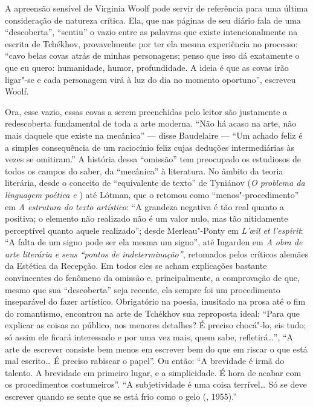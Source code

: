 A apreensão sensível de Virginia Woolf pode servir de referência
para uma última consideração de natureza crítica. Ela, que nas
páginas de seu diário fala de uma ``descoberta'', ``sentiu'' o
vazio entre as palavras que existe intencionalmente na escrita
de Tchékhov, provavelmente por ter ela mesma experiência no
processo: ``cavo belas covas atrás de minhas personagens; penso que
isso dá exatamente o que eu quero: humanidade, humor, profundidade.
A ideia é que as covas irão ligar"-se e cada personagem virá à luz
do dia no momento oportuno'', escreveu Woolf. 

Ora, esse vazio, essas covas a serem preenchidas pelo leitor são
justamente a redescoberta fundamental de toda a arte moderna.
``Não há acaso na arte, não mais daquele que existe na mecânica''
--- disse Baudelaire --- ``Um achado feliz é a simples consequência
de um raciocínio feliz cujas deduções intermediárias às vezes se
omitiram.'' A história dessa ``omissão'' tem preocupado os estudiosos
de todos os campos do saber, da ``mecânica'' à literatura. No âmbito
da teoria literária, desde o conceito de ``equivalente de texto''
de Tyniánov (\emph{O problema da linguagem poética  e })
até Lótman, que o retomou como ``menos"-procedimento'' em \emph{A estrutura
do texto artístico}: ``A grandeza negativa é tão real quanto a positiva; o
elemento não realizado não é um valor nulo, mas tão nitidamente perceptível
quanto aquele realizado''; desde Merleau"-Ponty em \emph{L'œil et
l'espirit}: ``A falta de um signo pode ser ela mesma um signo'',
até Ingarden em \emph{A obra de arte literária e seus ``pontos de
indeterminação''}, retomados pelos críticos alemães da Estética da
Recepção. Em todos eles se acham explicações bastante convincentes
do fenômeno da omissão e, principalmente, a comprovação de que,
mesmo que sua ``descoberta'' seja recente, ela sempre foi um
procedimento inseparável do fazer artístico. Obrigatório na
poesia, inusitado na prosa até o fim do romantismo, encontrou na
arte de Tchékhov sua reproposta ideal: ``Para que explicar as
coisas ao público, nos menores detalhes? É preciso chocá"-lo, eis
tudo; só assim ele ficará interessado e por uma vez mais, quem
sabe, refletirá\ldots{}'', ``A arte de escrever consiste bem menos
em escrever bem do que em riscar o que está mal escrito\ldots{} É
preciso rabiscar o papel''. Ou então: ``A brevidade é irmã do
talento. A brevidade em primeiro lugar, e a simplicidade. É hora
de acabar com os procedimentos costumeiros''. ``A subjetividade é
uma coisa terrível\ldots{} Só se deve escrever quando se sente que
se está frio como o gelo (, 1955).''

